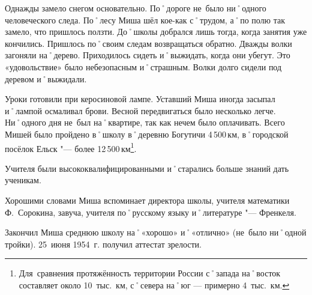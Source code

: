 Однажды замело снегом основательно. По˚дороге не~было ни˚одного человеческого следа. По˚лесу Миша шёл кое-как с˚трудом, а˚по полю так замело, что пришлось ползти. До˚школы добрался лишь тогда, когда занятия уже кончились. Пришлось по˚своим следам возвращаться обратно. Дважды волки загоняли на˚дерево. Приходилось сидеть и˚выжидать, когда они убегут. Это «удовольствие» было небезопасным и˚страшным. Волки долго сидели под деревом и˚выжидали.

Уроки готовили при керосиновой лампе. Уставший Миша иногда засыпал и˚лампой осмаливал брови. Весной передвигаться было несколько легче. Ни˚одного дня не~был на˚квартире, так как нечем было оплачивать. Всего Мишей было пройдено в˚школу в˚деревню Богутичи 4\,500\,км, в˚городской посёлок Ельск "--- более 12\,500\,км\footnote{Для~сравнения протяжённость территории России с˚запада на˚восток составляет около 10~тыс.~км, с˚севера на˚юг — примерно 4~тыс.~км.}. 

Учителя были высококвалифицированными и˚старались больше знаний дать ученикам.

Хорошими словами Миша вспоминает директора школы, учителя математики Ф.~Сорокина, завуча, учителя по˚русскому языку и˚литературе "--- Френкеля. 

Закончил Миша среднюю школу на˚«хорошо» и˚«отлично» (не~было ни˚одной тройки). 25~июня 1954~г. получил аттестат зрелости.


